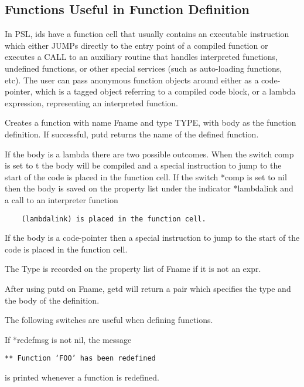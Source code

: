 \subsection{Functions Useful in Function Definition}

  In  PSL,  ids  have  a  function cell that usually contains an
executable instruction which either JUMPs directly to the  entry
point  of a compiled function or executes a CALL to an auxiliary
routine that handles interpreted functions, undefined functions,
or other special services (such as auto-loading functions, etc).
The user can pass anonymous function objects around either as  a
code-pointer,  which  is a tagged object referring to a compiled
code block, or a lambda expression, representing an  interpreted
function.


{    
Creates  a function with name Fname and type TYPE, with body
    as the function definition.  If successful, putd returns the
    name of the defined function.
}

    If the body is a lambda there  are  two  possible  outcomes.
    When  the  switch comp is set to t the body will be compiled
    and a special instruction to jump to the start of  the  code
    is  placed in the function cell.  If the switch *comp is set
    to nil then the body is saved on the property list under the
    indicator *lambdalink and a call to an interpreter  function
\begin{verbatim}
    (lambdalink) is placed in the function cell.
\end{verbatim}
    If  the body is a code-pointer then a special instruction to
    jump to the start of the code  is  placed  in  the  function
    cell.

    The  Type is recorded on the property list of Fname if it is
    not an expr.

    After using putd on Fname, getd will  return  a  pair  which
    specifies the type and the body of the definition.

  The following switches are useful when defining functions.

{If *redefmsg is not nil, the message

    {\tt *** Function `FOO' has been redefined}

    is printed whenever a function is redefined.
}

